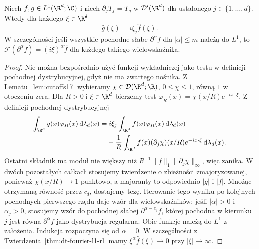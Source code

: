 \begin{wniosek}
\label{cor:dt-fourier-weak-derivative-l1}
Niech $f,g\in L^1(\R^d;\C)$ i niech
$\partial_jT_f=T_g$ w $\mathcal D'(\R^d)$
dla ustalonego $j\in\{1,\ldots,d\}$.
Wtedy dla każdego $\xi\in\R^d$
\[
 \widehat g(\xi)=i\xi_j\widehat f(\xi).
\]
W szczególności jeśli wszystkie pochodne słabe
$\partial^\alpha f$ dla $|\alpha|\le m$ należą do $L^1$,
to $\mathcal F(\partial^\alpha f)=(i\xi)^\alpha\widehat f$
dla każdego takiego wielowskaźnika.
\end{wniosek}
\begin{proof}
Nie można bezpośrednio użyć funkcji wykładniczej
jako testu w definicji pochodnej dystrybucyjnej,
gdyż nie ma zwartego nośnika.
Z Lematu~\ref{lem:cutoffs17} wybieramy
$\chi\in\mathcal D(\R^d;\R)$, $0\le\chi\le1$,
równą $1$ w otoczeniu zera. Dla $R>0$ i
$\xi\in\R^d$ bierzemy test
$\varphi_R(x)=\chi(x/R)e^{-ix\cdot\xi}$.
Z definicji pochodnej dystrybucyjnej
\[
\begin{aligned}
 \int_{\R^d}g(x)\varphi_R(x)\,\mathrm d\lambda_d(x)
 &=i\xi_j\int_{\R^d} f(x)\varphi_R(x)\,\mathrm d\lambda_d(x)\\
 &\quad-\frac1R\int_{\R^d}f(x)(\partial_j\chi)(x/R)
 e^{-ix\cdot\xi}\,\mathrm d\lambda_d(x).
\end{aligned}
\]
Ostatni składnik ma moduł nie większy niż
$R^{-1}\|f\|_1\|\partial_j\chi\|_\infty$, więc zanika.
W dwóch pozostałych całkach stosujemy twierdzenie
o zbieżności zmajoryzowanej, ponieważ
$\chi(x/R)\to1$ punktowo, a majoranty to odpowiednio
$|g|$ i $|f|$.
Mnożąc otrzymaną równość przez $c_d$, dostajemy tezę.
Iterowanie tego wyniku po kolejnych pochodnych
pierwszego rzędu daje wzór dla wielowskaźników:
jeśli $|\alpha|>0$ i $\alpha_j>0$, stosujemy wzór
do pochodnej słabej $\partial^{\alpha-e_j}f$,
której pochodna w kierunku $j$ jest równa
$\partial^\alpha f$ jako dystrybucja regularna.
Obie funkcje należą do $L^1$ z założenia.
Indukcja rozpoczyna się od $\alpha=0$.
W szczególności z Twierdzenia~\ref{thm:dt-fourier-l1-rl}
mamy $\xi^\alpha\widehat f(\xi)\to0$ przy $|\xi|\to\infty$.
\end{proof}

